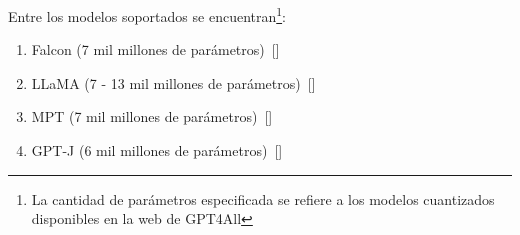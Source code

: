         Entre los modelos soportados se encuentran\footnote{La cantidad de parámetros especificada se refiere a los modelos cuantizados disponibles en la web de GPT4All}:

        \begin{enumerate}
            \item Falcon (7 mil millones de parámetros)~[\cite{falcon}]
            \item LLaMA (7 - 13 mil millones de parámetros)~[\cite{llama}]
            \item MPT (7 mil millones de parámetros)~[\cite{mpt}]
            \item GPT-J (6 mil millones de parámetros)~[\cite{gptj}]
        \end{enumerate}

